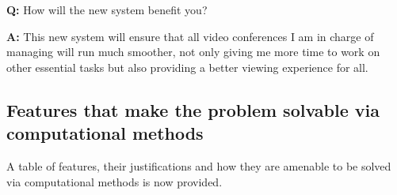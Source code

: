 \begin{tcolorbox}[
  boxrule=0pt, frame empty, colback=lightgray, arc=0pt
]
  \textbf{Q:} How will the new system benefit you? 
  \vspace{0.05cm}

  \textbf{A:} This new system will ensure that all video 
  conferences I am in charge of managing will run much 
  smoother, not only giving me more time to work on other 
  essential tasks but also providing a better viewing
  experience for all.

\end{tcolorbox}

\subsection{Features that make the problem solvable via
computational methods}

A table of features, their justifications and how they are 
amenable to be solved via computational methods is now
provided. 

